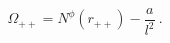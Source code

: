 \begin{equation}
\Omega_{++} = N^{\phi}(r_{++}) - \frac{a}{l^2} \ .
\label{omega++}
\end{equation}

